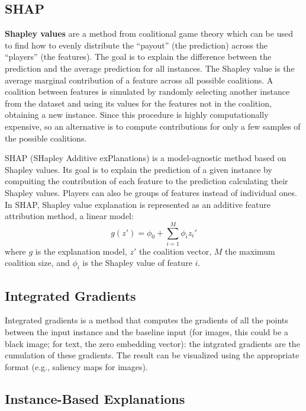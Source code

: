 \subsection{SHAP}

\textbf{Shapley values} are a method from coalitional game theory which can be used to find how to evenly distribute the ``payout'' (the prediction) across the ``players'' (the features). The goal is to explain the difference between the prediction and the average prediction for all instances. The Shapley value is the average marginal contribution of a feature across all possible coalitions. A coalition between features is simulated by randomly selecting another instance from the dataset and using its values for the features not in the coalition, obtaining a new instance. Since this procedure is highly computationally expensive, so an alternative is to compute contributions for only a few samples of the possible coalitions.

SHAP (SHapley Additive exPlanations) is a model-agnostic method based on Shapley values. Its goal is to explain the prediction of a given instance by compuiting the contribution of each feature to the prediction calculating their Shapley values. Players can also be groups of features instead of individual ones. In SHAP, Shapley value explanation is represented as an additive feature attribution method, a linear model:
\begin{equation*}
    g(z') = \phi_0 + \sum_{i=1}^M \phi_i z_i'
\end{equation*}
where $g$ is the explanation model, $z'$ the coalition vector, $M$ the maximum coalition size, and $\phi_i$ is the Shapley value of feature $i$.

\subsection{Integrated Gradients}

Integrated gradients is a method that computes the gradients of all the points between the input instance and the baseline input (for images, this could be a black image; for text, the zero embedding vector): the intgrated gradients are the cumulation of these gradients. The result can be visualized using the appropriate format (e.g., saliency maps for images).

\subsection{Instance-Based Explanations}

